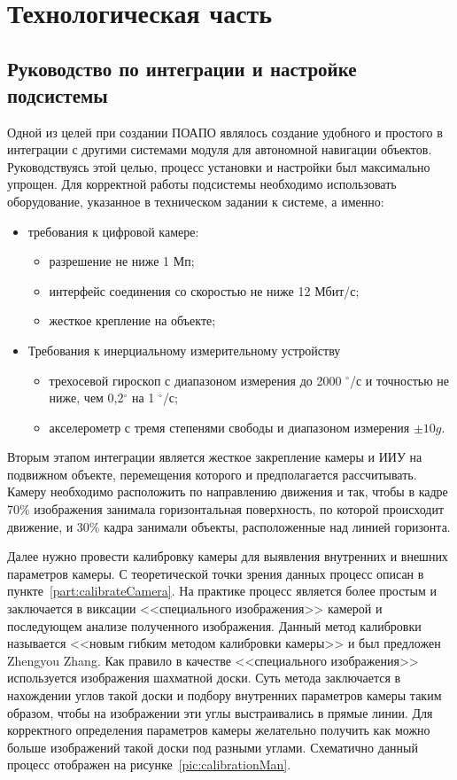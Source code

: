 \newpage
~
\section{Технологическая часть}

\subsection{Руководство по интеграции и настройке подсистемы}
Одной из целей при создании ПОАПО являлось создание удобного и простого в интеграции с другими системами модуля для автономной навигации объектов. Руководствуясь этой целью, процесс установки и настройки был максимально упрощен. 
Для корректной работы подсистемы необходимо использовать оборудование, указанное в техническом задании к системе, а именно:
\begin{itemize}
\item требования к цифровой камере:
	\begin{itemize}
	\item разрешение не ниже 1 Мп;
	\item интерфейс соединения со скоростью не ниже 12 Мбит/с;
	\item жесткое крепление на объекте;
	\end{itemize}
\item Требования к инерциальному измерительному устройству 
 	\begin{itemize}
 	\item трехосевой гироскоп с диапазоном измерения до 2000 $^\circ$/с и точностью не ниже, чем 0,2$^\circ$ на 1 $^\circ$/с;
	\item акселерометр с тремя степенями свободы и диапазоном измерения $\pm10g$.
 	\end{itemize}
\end{itemize}

Вторым этапом интеграции является жесткое закрепление камеры и ИИУ на подвижном объекте, перемещения которого и предполагается рассчитывать. Камеру необходимо расположить по направлению движения и так, чтобы в кадре 70\% изображения занимала горизонтальная поверхность, по которой происходит движение, и 30\% кадра занимали объекты, расположенные над линией горизонта.  

Далее нужно провести калибровку камеры для выявления внутренних и внешних параметров камеры. С теоретической точки зрения данных процесс описан в пункте~\ref{part:calibrateCamera}. На практике процесс является более простым и заключается в виксации <<специального изображения>> камерой и последующем анализе полученного изображения. Данный метод калибровки называется <<новым гибким методом калибровки камеры>> и был предложен Zhengyou Zhang\cite{Zhang}. Как правило в качестве <<специального изображения>> используется изображения шахматной доски. Суть метода заключается в нахождении углов такой доски и подбору внутренних параметров камеры таким образом, чтобы на изображении эти углы выстраивались в прямые линии. Для корректного определения параметров камеры желательно получить как можно больше изображений такой доски под разными углами. Схематично данный процесс отображен на рисунке~\ref{pic:calibrationMan}.

